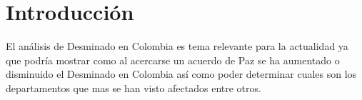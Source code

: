 \section{Introducción}
	El análisis de Desminado en Colombia es tema relevante para la actualidad ya que podría mostrar como al acercarse un acuerdo de Paz se ha aumentado o disminuido el Desminado en Colombia así como poder determinar cuales son los departamentos que mas se han visto afectados entre otros.
